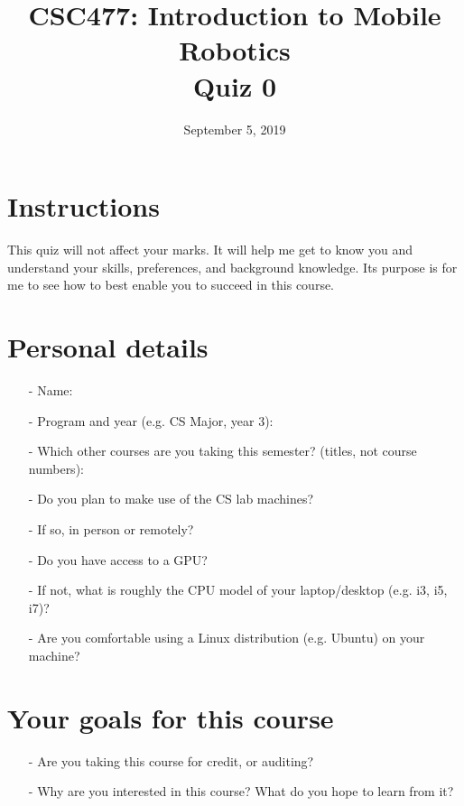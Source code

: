 \documentclass{article}
\title{CSC477: Introduction to Mobile Robotics \\ Quiz 0}
\date{September 5, 2019}
\begin{document}
\maketitle

\section{Instructions} This quiz will not affect your marks. It will help me get to know you and understand your skills, preferences, and background knowledge. Its purpose is for me to see how to best enable you to succeed in this course.
\newline

\section{Personal details}
\begin{itemize}
\item[-] Name:
\item[-] Program and year (e.g. CS Major, year 3):
\item[-] Which other courses are you taking this semester? (titles, not course numbers):
\item[-] Do you plan to make use of the CS lab machines?
\item[-] If so, in person or remotely?
\item[-] Do you have access to a GPU?
\item[-] If not, what is roughly the CPU model of your laptop/desktop (e.g. i3, i5, i7)?
\item[-] Are you comfortable using a Linux distribution (e.g. Ubuntu) on your machine?
\end{itemize}

\section{Your goals for this course}
\begin{itemize}
\item[-] Are you taking this course for credit, or auditing?
\item[-] Why are you interested in this course? What do you hope to learn from it?
\end{itemize}
\end{document}
